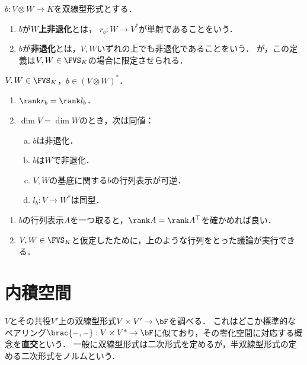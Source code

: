 \documentclass[uplatex, dvipdfmx]{jsreport}
\begin{document}
\begin{definition}
    $b:V\otimes W\to K$を双線型形式とする．
    \begin{enumerate}
        \item $b$が\textbf{$W$上非退化}とは，
        $r_b:W\to V^*$が単射であることをいう．
        \item $b$が\textbf{非退化}とは，$V,W$いずれの上でも非退化であることをいう．
        が，この定義は$V,W\in\FVS_K$の場合に限定させられる．
    \end{enumerate}
\end{definition}

\begin{proposition}[非退化であることと完全であることは同値]
    $V,W\in\FVS_K$，$b\in(V\otimes W)^*$．
    \begin{enumerate}
        \item $\rank r_b=\rank l_b$．
        \item $\dim V=\dim W$のとき，次は同値：
        \begin{enumerate}[(a)]
            \item $b$は非退化．
            \item $b$は$W$で非退化．
            \item $V,W$の基底に関する$b$の行列表示が可逆．
            \item $l_b:V\to W^*$は同型．
        \end{enumerate}
    \end{enumerate}
\end{proposition}
\begin{Proof}\mbox{}
    \begin{enumerate}
        \item $b$の行列表示$A$を一つ取ると，$\rank A=\rank A^\top$を確かめれば良い．
        \item $V,W\in\FVS_K$と仮定したために，上のような行列をとった議論が実行できる．
    \end{enumerate}
\end{Proof}

\section{内積空間}

\begin{tcolorbox}[colframe=ForestGreen, colback=ForestGreen!10!white,breakable,colbacktitle=ForestGreen!40!white,coltitle=black,fonttitle=\bfseries\sffamily,
title=]
    $V$とその共役$V'$上の双線型形式$V\times V'\to\bF$を調べる．
    これはどこか標準的なペアリング$\brac{-,-}:V\times V^*\to\bF$に似ており，その零化空間に対応する概念を\textbf{直交}という．
    一般に双線型形式は二次形式を定めるが，半双線型形式の定める二次形式をノルムという．
\end{tcolorbox}
\end{document}
